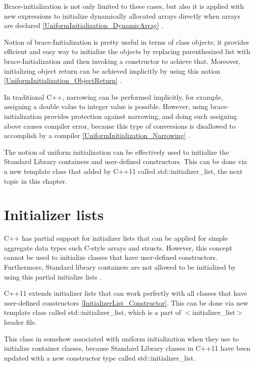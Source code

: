 \documentclass[11pt]{report}
\begin{document}
Brace-initialization is not only limited to these cases, but also it is applied with new expressions to initialize dynamically allocated arrays directly when arrays are declared \ref{UniformInitialization_DynamicArray} \cite{Reddy:2011:API}.

Notion of brace-Initialization is pretty useful in terms of class objects; it provides efficient and easy way to initialize the objects by replacing parenthesized list with brace-Initialization and then invoking a constructor to achieve that. Moreover, initializing object return can be achieved implicitly by using this notion \ref{UniformInitialization_ObjectReturn} \cite{Gregorie:professionalcpp}.


In traditional C++, narrowing can be performed implicitly, for example, assigning a double value to integer value is possible. However, using brace- initialization provides protection against narrowing, and doing such assigning above causes compiler error, because this type of conversions is disallowed to accomplish by a compiler \ref{UniformInitialization_Narrowing} \cite{Gregorie:professionalcpp}.


The notion of uniform initialization can be effectively used to initialize the Standard Library containers and user-defined constructors. This can be done via a new template class that added by C++11 called std::initializer\_list, the next topic in this chapter.


\section{Initializer lists}
\label{section: Initializer lists}
C++ has partial support for initializer lists that can be applied for simple aggregate data types such C-style arrays and structs. However, this concept cannot be used to initialize classes that have user-defined constructors. Furthermore, Standard library containers are not allowed to be initialized by using this partial initialize lists \cite{Reddy:2011:API}.


C++11 extends initializer lists that can work perfectly with all classes that have user-defined constructors \ref{InitializerList_Constructor}. This can be done via new template class called std::initializer\_list, which is a part of $<$initializer\_list$>$ header file.


This class in somehow associated with uniform initialization when they use to initialize container classes, because Standard Library classes in C++11 have been updated with a new constructor type called std::initializer\_list.
\end{document}
